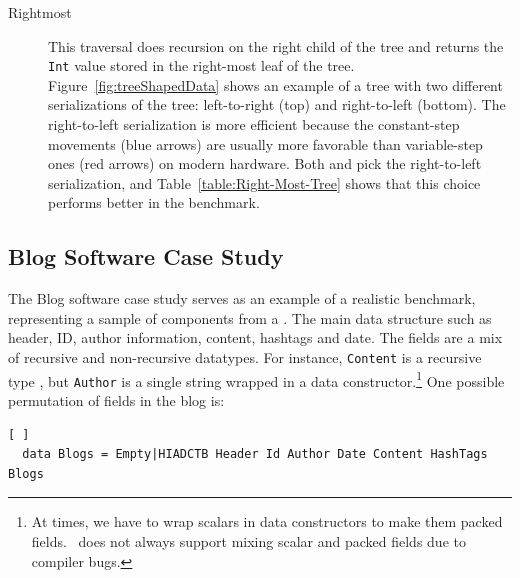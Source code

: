 \begin{description}
\item[Rightmost]%
This traversal does recursion on the right child of the tree and returns the \lstinline|Int| value stored in the right-most leaf of the tree.
%
Figure~\ref{fig:treeShapedData} shows an example of a tree with two different serializations of the tree: left-to-right (top) and right-to-left (bottom).
The right-to-left serialization is more efficient because the constant-step movements (blue arrows) are usually more favorable than variable-step ones (red arrows) on modern hardware.
%
Both \systemSolver and \systemGreedy pick the right-to-left serialization, and
Table~\ref{table:Right-Most-Tree} shows that this choice performs better in the benchmark.
%
\end{description}

\subsection{Blog Software Case Study}
\label{subsect:blog}

The Blog software case study serves as an example of a realistic benchmark, representing a sample of components 
from a . The main data structure  such as header, ID, author information, content, hashtags and date. The fields are a mix
of recursive and non-recursive datatypes. For instance, \lstinline{Content} is a recursive type 
, but \lstinline{Author} is a single string wrapped in a data
constructor.\footnote{At times, we have to wrap scalars in data constructors to make them packed fields.~\gibbon
does not always support mixing scalar and packed fields due to compiler bugs.}
One possible permutation of fields in the blog is:
%
\begin{lstlisting}[ ]
  data Blogs = Empty|HIADCTB Header Id Author Date Content HashTags Blogs
\end{lstlisting} 
%

